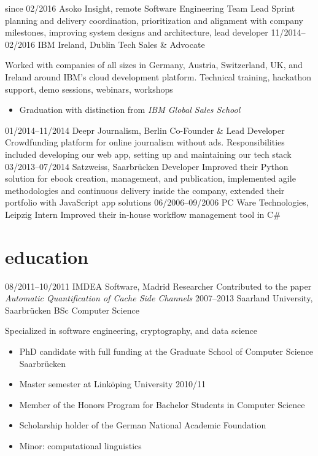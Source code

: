 \documentclass[a4paper]{cv}
\begin{document}
  \begin{entrylist}
    \entry
      {since 02/2016}
      {Asoko Insight, remote}
      {Software Engineering Team Lead}
      {Sprint planning and delivery coordination, prioritization and alignment with company milestones, improving system designs and architecture, lead developer}
    \entry
      {11/2014--02/2016}
      {IBM Ireland, Dublin}
      {Tech Sales \& Advocate}
      {Worked with companies of all sizes in Germany, Austria, Switzerland, UK, and Ireland around IBM’s cloud development platform. Technical training, hackathon support, demo sessions, webinars, workshops
        \begin{itemize}[leftmargin=0.3cm]
          \item Graduation with distinction from \emph{IBM Global Sales School}
        \end{itemize}
      }
    \entry
      {01/2014--11/2014}
      {Deepr Journalism, Berlin}
      {Co-Founder \& Lead Developer}
      {Crowdfunding platform for online journalism without ads. Responsibilities included developing our web app, setting up and maintaining our tech stack}
    \entry
      {03/2013--07/2014}
      {Satzweiss, Saarbrücken}
      {Developer}
      {Improved their Python solution for ebook creation, management, and publication, implemented agile methodologies and continuous delivery inside the company, extended their portfolio with JavaScript app solutions}
    \entry
      {06/2006--09/2006}
      {PC Ware Technologies, Leipzig}
      {Intern}
      {Improved their in-house workflow management tool in C\#}
  \end{entrylist}

  \section{education}

  \begin{entrylist}
    \entry
      {08/2011--10/2011}
      {IMDEA Software, Madrid}
      {Researcher}
      {Contributed to the paper \emph{Automatic Quantification of Cache Side Channels}}
    \entry
      {2007--2013}
      {Saarland University, Saarbrücken}
      {BSc Computer Science}
      {Specialized in software engineering, cryptography, and data science
        \begin{itemize}[leftmargin=0.3cm]
          \item PhD candidate with full funding at the Graduate School of Computer Science Saarbrücken
          \item Master semester at Linköping University 2010/11
          \item Member of the Honors Program for Bachelor Students in Computer Science
          \item Scholarship holder of the German National Academic Foundation
          \item Minor: computational linguistics
        \end{itemize}
      }
  \end{entrylist}
\end{document}
